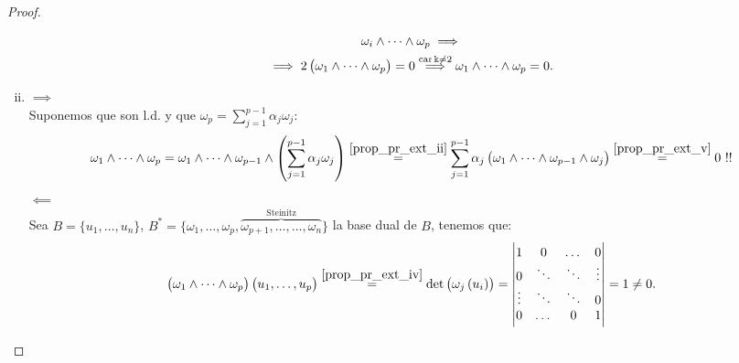 \begin{proof}
\begin{enumerate}[i)]
\begin{gather*}
        \omega_i \wedge \dots \wedge \omega_p \implies \\
        \implies 2\left( \omega_1 \wedge \dots \wedge \omega_p \right) = 0
        \stackrel{\operatorname{car} \Bbbk \neq 2}{\implies} \omega_1 \wedge \dots \wedge \omega_p = 0.
        \end{gather*}
        \item $\implies$ \\
        Suponemos que son l.d. y que $\omega_p = \sum_{j=1}^{p-1} \alpha_j \omega_j$:
        \[
        \omega_1 \wedge \dots \wedge \omega_p = \omega_1 \wedge \dots \wedge \omega_{p-1} \wedge \left(
        \sum_{j=1}^{p-1} \alpha_j \omega_j \right) \stackrel{\ref{prop_pr_ext_ii}}{=} \sum_{j=1}^{p-1}
        \alpha_j \left( \omega_1 \wedge \dots \wedge \omega_{p-1} \wedge \omega_j \right)
        \stackrel{\ref{prop_pr_ext_v}}{=} 0 \text{ } !!
        \]
        $\impliedby$ \\
        Sea $B=\{u_1,\dots,u_n\}$, $B^*=\{\omega_1, \dots, \omega_p,\overbrace{\omega_{p+1},\dots, \dots,
            \omega_n}^{\text{Steinitz}} \}$ la base dual de $B$, tenemos que:
        \[
        \left( \omega_1 \wedge \dots \wedge \omega_p \right) \left( u_1,\dots,u_p \right) \stackrel{\ref{prop_pr_ext_iv}}{=}
        \det\left( \omega_j \left(u_i \right) \right) =
        \begin{vmatrix}
            1 & 0 & \dots & 0 \\
            0 & \ddots & \ddots & \vdots \\
            \vdots & \ddots & \ddots & 0 \\
            0 & \dots & 0 & 1
        \end{vmatrix}
        = 1 \neq 0.
        \]
    \end{enumerate}
\end{proof}


